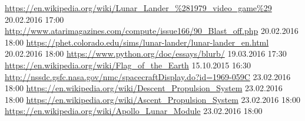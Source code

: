 \documentclass[hidelinks]{article}
\begin{document}
\begin{thebibliography}{999}
 \url{https://en.wikipedia.org/wiki/Lunar_Lander_%281979_video_game%29} 20.02.2016 17:00
 \url{http://www.atarimagazines.com/compute/issue166/90_Blast_off.php} 20.02.2016 18:00
 \url{https://phet.colorado.edu/sims/lunar-lander/lunar-lander_en.html} 20.02.2016 18:00
 \url{https://www.python.org/doc/essays/blurb/} 19.03.2016 17:30
 \url{https://en.wikipedia.org/wiki/Flag_of_the_Earth} 15.10.2015 16:30
 \url{http://nssdc.gsfc.nasa.gov/nmc/spacecraftDisplay.do?id=1969-059C} 23.02.2016 18:00
 \url{https://en.wikipedia.org/wiki/Descent_Propulsion_System} 23.02.2016 18:00
 \url{https://en.wikipedia.org/wiki/Ascent_Propulsion_System} 23.02.2016 18:00
 \url{https://en.wikipedia.org/wiki/Apollo_Lunar_Module} 23.02.2016 18:00
\end{thebibliography}
\end{document}
